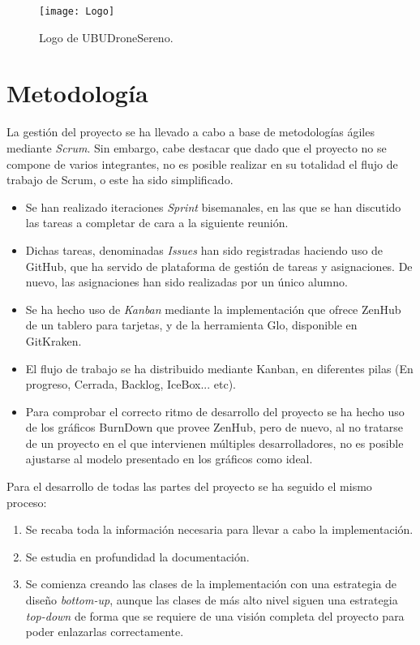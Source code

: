 \begin{figure}
	\centering
	\texttt{[image: Logo]}
	\caption[Logo]{Logo de UBUDroneSereno.}\label{fig:Logo}
\end{figure}



\section{Metodología}

La gestión del proyecto se ha llevado a cabo a base de metodologías ágiles mediante \emph{Scrum}.
Sin embargo, cabe destacar que dado que el proyecto no se compone de varios integrantes, no es posible realizar en su totalidad el flujo de trabajo de Scrum, o este ha sido simplificado. 

\begin{itemize} 
\item Se han realizado iteraciones \emph{Sprint} bisemanales, en las que se han discutido las tareas a completar de cara a la siguiente reunión. 
\item Dichas tareas, denominadas \emph{Issues} han sido registradas haciendo uso de GitHub, que ha servido de plataforma de gestión de tareas y asignaciones. De nuevo, las asignaciones han sido realizadas por un único alumno. 
\item Se ha hecho uso de \emph{Kanban} mediante la implementación que ofrece ZenHub de un tablero para tarjetas, y de la herramienta Glo, disponible en GitKraken. 
\item El flujo de trabajo se ha distribuido mediante Kanban, en diferentes pilas (En progreso, Cerrada, Backlog, IceBox... etc).
\item Para comprobar el correcto ritmo de desarrollo del proyecto se ha hecho uso de los gráficos BurnDown que provee ZenHub, pero de nuevo, al no tratarse de un proyecto en el que intervienen múltiples desarrolladores, no es posible ajustarse al modelo presentado en los gráficos como ideal. 
\end{itemize}

Para el desarrollo de todas las partes del proyecto se ha seguido el mismo proceso: 
\begin{enumerate}
\item Se recaba toda la información necesaria para llevar a cabo la implementación.
\item Se estudia en profundidad la documentación.
\item Se comienza creando las clases de la implementación con una estrategia de diseño \emph{bottom-up}, aunque las clases de más alto nivel siguen una estrategia \emph{top-down} de forma que se requiere de una visión completa del proyecto para poder enlazarlas correctamente.
\end{enumerate}


